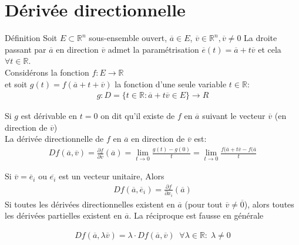        \section{Dérivée directionnelle}
       \begin{parag}{Définition}
           Soit $E \subset \mathbb{R}^n $ sous-ensemble ouvert, $ \overline{a} \in E$, $\overline{v} \in \mathbb{R}^n , \overline{v} \neq 0$ La droite passant par $ \overline{a}$ en direction $ \overline{v}$ admet la paramétrisation $ \overline{e}(t) = \overline{a}  + t \overline{v}$ et cela $ \forall t \in \mathbb{R}$.\\
           Considérons la fonction $ f : E \to \mathbb{R}$\\
           et soit $g(t) = f( \overline{a} + t + \overline{v})$ la fonction d'une seule variable $t \in \mathbb{R}$:
           \begin{align*}
               g: D = \{t \in \mathbb{R}: \overline{a} + t \overline{v} \in E\} \to R
           \end{align*}
           \begin{definition}
               Si $g$ est dérivable en $t = 0$ on dit qu'il existe  de $f$ en $ \overline{a}$ suivant le vecteur $ \overline{v}$ (en direction de $\overline{v}$)\\
               La dérivée directionnelle de $f$ en $ \overline{a}$ en direction de $ \overline{v}$ est:
               \begin{align*}
                   Df( \overline{a}, \overline{v}) = \frac{\partial f}{\partial \overline{v}}( \overline{a}) = \lim_{t \to 0} \frac{g(t) - g(0)}{t} = \lim_{t \to 0} \frac{f( \overline{a} + t \overline{v}- f( \overline{a}}{t}
               \end{align*}
               
           \end{definition}
           
       \begin{framedremark}
           Si $ \overline{v} = \overline{e}_i$ ou $ \overline{e_i}$ est un vecteur unitaire, Alors \begin{align*}
              Df( \overline{a}, \overline{e}_i) = \frac{\partial f}{\partial x_i}( \overline{a})
           \end{align*}
           Si toutes les dérivées directionnelles existent en $ \overline{a}$ (pour tout $ \overline{v} \neq \overline{0}$), alors toutes les dérivées partielles existent en $ \overline{a}$. La réciproque est fausse en générale
       \end{framedremark}
         \begin{framedremark}
             \begin{align*}
                 Df( \overline{a}, \lambda \overline{v}) = \lambda \cdot Df( \overline{a}, \overline{v}) \;\; \forall \lambda \in \mathbb{R}: \; \lambda \neq 0
             \end{align*}
             
         \end{framedremark}
           
       
       \end{parag}
       
